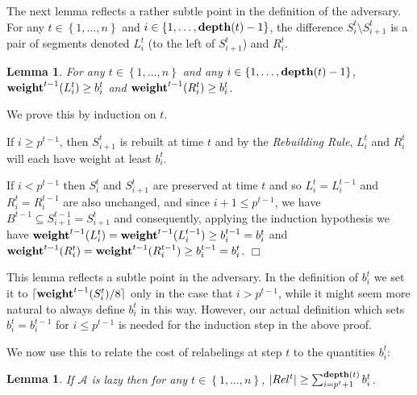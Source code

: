 \documentclass[11pt]{article}
\newtheorem{lemma}[theorem]{Lemma}
\newcommand{\qed}{$\Box$}
\newenvironment{proof}{\noindent {\bf Proof:}}{\hfill \qed \smallskip}
\newcommand{\A}{\mathcal{A}}
\newcommand{\natInt}[2]{ \left\{ #1, \dotsc, #2 \right\} }
\newcommand{\weight}{{\rm {\bf weight}}}
\newcommand{\depth}{{\rm {\bf depth}}}
\begin{document}
The next lemma reflects a rather subtle point in the definition of the adversary.
For any $t \in \natInt{1}{n}$ and $i \in \natInt{1}{\depth(t)-1}$, the
difference $S^t_i \setminus S^t_{i+1}$ is a pair of segments denoted $L^t_i$ (to the left of $S^t_{i+1}$)
and $R^t_i$.  

\begin{lemma}
\label{l-b}  For  any $t \in \natInt{1}{n}$ and any $i \in \natInt{1}{\depth(t)-1}$, $\weight^{t-1}(L^t_i) \geq b^t_i$
and $\weight^{t-1}(R^t_i) \geq b^t_i$.
\end{lemma}

\begin{proof}
We prove this by induction on $t$.  

If $i \geq  p^{t-1}$, then $S^t_{i+1}$ is rebuilt at time $t$ and by the \emph{Rebuilding Rule},
$L^t_i$ and $R^t_i$ will each have weight at least $b^t_i$.

If $i < p^{t-1}$ then $S^t_i$ and $S^t_{i+1}$ are preserved at time $t$ and so $L^t_i=L^{t-1}_i$ and $R^t_i=R^{t-1}_i$
are also unchanged, and since $i+1 \leq p^{t-1}$, we have $B^{t-1} \subseteq S^{t-1}_{i+1}=S^{t}_{i+1}$
and consequently, applying the induction hypothesis
we have $\weight^{t-1}(L^t_i)=\weight^{t-1}(L^{t-1}_i) \geq b^{t-1}_i=b^t_i$ 
and $\weight^{t-1}(R^t_i)=\weight^{t-1}(R^{t-1}_i) \geq b^{t-1}_i=b^t_i$.  
\end{proof}
   
This lemma reflects a subtle point in the adversary.  In the definition of $b^t_i$
we set it to $\lceil \weight^{t-1}(S^t_i)/8 \rceil$ only in the case that $i >p^{t-1}$,
while it might seem more natural to always define $b^t_i$ in this way.  However,
our actual definition which sets $b^t_i=b^{t-1}_i$ for $i \leq p^{t-1}$ is
needed for the induction step in the above proof.

We now use this to relate the cost of relabelings at step $t$ to the quantities $b^t_i$:

\begin{lemma}
\label{l-rel}
If $\A$ is lazy then for any $t \in \natInt{1}{n}$, $|Rel^t| \ge \sum_{i=p^t+1}^{\depth(t)} b^t_i$.
\end{lemma}
\end{document}
